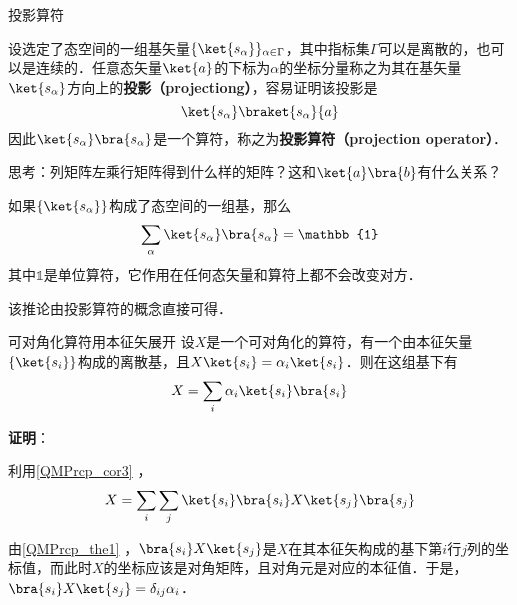 \begin{example}{投影算符}

设选定了态空间的一组基矢量$\{\ket{s_\alpha}\}_{\alpha\in \Gamma}$，其中指标集$\Gamma$可以是离散的，也可以是连续的．任意态矢量$\ket{a}$的下标为$\alpha$的坐标分量称之为其在基矢量$\ket{s_\alpha}$方向上的\textbf{投影（projectiong）}，容易证明该投影是
\begin{equation}
\ket{s_\alpha}\braket{s_\alpha}{a}
\end{equation}
因此$\ket{s_\alpha}\bra{s_\alpha}$是一个算符，称之为\textbf{投影算符（projection operator）}．

思考：列矩阵左乘行矩阵得到什么样的矩阵？这和$\ket{a}\bra{b}$有什么关系？

\end{example}


\begin{corollary}{}\label{QMPrcp_cor3}
如果$\{\ket{s_\alpha}\}$构成了态空间的一组基，那么
\begin{equation}
\sum_\alpha \ket{s_\alpha}\bra{s_\alpha} = \mathbb{1}
\end{equation}
其中$\mathbb{1}$是单位算符，它作用在任何态矢量和算符上都不会改变对方．
\end{corollary}

该推论由投影算符的概念直接可得．






\begin{corollary}{可对角化算符用本征矢展开}\label{QMPrcp_cor2}
设$X$是一个可对角化的算符，有一个由本征矢量$\{\ket{s_i}\}$构成的离散基，且$X\ket{s_i}=\alpha_i\ket{s_i}$．则在这组基下有
\begin{equation}
X=\sum_{i}\alpha_i\ket{s_i}\bra{s_i}
\end{equation}
\end{corollary}

\textbf{证明}：


利用\autoref{QMPrcp_cor3} ，
\begin{equation}\label{QMPrcp_eq4}
X=\sum_{i}\sum_{j}\ket{s_i}\bra{s_i}X\ket{s_j}\bra{s_j}
\end{equation}

由\autoref{QMPrcp_the1} ，$\bra{s_i}X\ket{s_j}$是$X$在其本征矢构成的基下第$i$行$j$列的坐标值，而此时$X$的坐标应该是对角矩阵，且对角元是对应的本征值．于是，$\bra{s_i}X\ket{s_j}=\delta_{ij}\alpha_i$．

